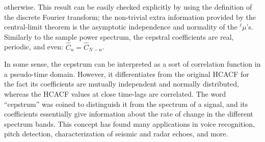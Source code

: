 otherwise.
This result can be easily checked explicitly by using the definition of the discrete Fourier transform; the non-trivial extra information provided by the central-limit theorem is the asymptotic independence and normality of the $^{\ell}\mu$'s. Similarly to the sample power spectrum, the cepstral coefficients are real, periodic, and even: $\hat C_{n} = \hat C_{N-n}$. 
\begin{LEtext}
In some sense, the cepstrum can be interpreted as a sort of correlation function in a pseudo-time domain. However, it differentiates from the original HCACF for the fact its coefficients are mutually independent and normally distributed, whereas the HCACF values at close time-lags are correlated. 
The word ``cepstrum'' was coined to distinguish it from the spectrum of a signal, and its coefficients essentially give information about the rate of change in the different spectrum bands. This concept has found many applications in voice recognition, pitch detection, characterization of seismic and radar echoes, and more. 
\end{LEtext}


